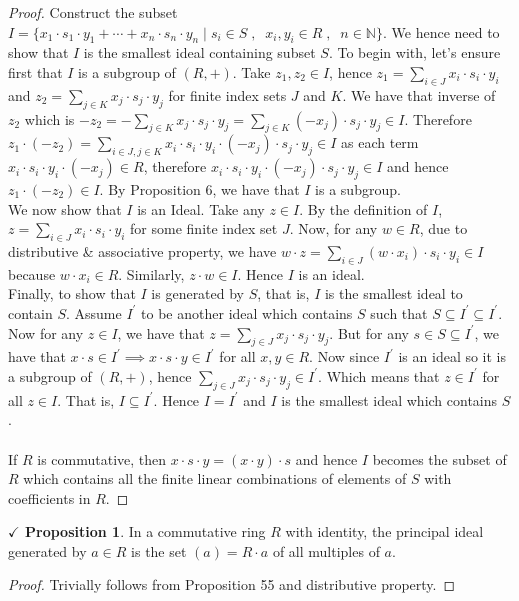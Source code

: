 \documentclass{article}
\theoremstyle{definition}
\theoremstyle{remark}
\theoremstyle{definition}
\theoremstyle{definition}
\newtheorem{proposition}{$\checkmark$ Proposition}
\theoremstyle{definition}
\theoremstyle{proof}
\begin{document}
\begin{proof}
	Construct the subset $ I = \{x_1\cdot s_1\cdot y_1 + \cdots + x_n\cdot s_n\cdot y_n \;\vert\;s_i \in S\;,\;\;x_i,y_i\in R\;,\;\;n\in \mathbb{N}\}$. We hence need to show that $ I $ is the smallest ideal containing subset $ S $. To begin with, let's ensure first that $ I $ is a subgroup of $ (R,+) $. Take $ z_1,z_2 \in I $, hence $ z_1 = \sum_{i\in J}x_i \cdot s_i \cdot y_i $ and $ z_2 = \sum_{j\in K} x_j\cdot s_j \cdot y_j$ for finite index sets $ J $ and $ K $. We have that inverse of $ z_2 $ which is $ -z_2 = - \sum_{j\in K}x_j\cdot s_j\cdot y_j = \sum_{j\in K}(-x_j)\cdot s_j\cdot y_j \in I$. Therefore $ z_1\cdot (-z_2) = \sum_{i\in J,j\in K}x_i\cdot s_i\cdot y_i \cdot (-x_j) \cdot s_j \cdot y_j \in I$ as each term $ x_i\cdot s_i\cdot y_i\cdot (-x_j) \in R $, therefore $ x_i\cdot s_i\cdot y_i \cdot (-x_j) \cdot s_j \cdot y_j \in I $ and hence $ z_1\cdot (-z_2)\in I $. By Proposition 6, we have that $ I $ is a subgroup.\\
	We now show that $ I $ is an Ideal. Take any $ z \in I $. By the definition of $ I $, $ z = \sum_{i\in J} x_i\cdot s_i\cdot y_i $ for some finite index set $ J $. Now, for any $ w\in R $, due to distributive \& associative property, we have $ w\cdot z = \sum_{i\in J}(w\cdot x_i)\cdot s_i\cdot y_i \in I $ because $ w\cdot x_i \in R$. Similarly, $ z\cdot w\in I $. Hence $ I $ is an ideal.\\
	Finally, to show that $ I $ is generated by $ S $, that is, $ I $ is the smallest ideal to contain $ S $. Assume $ I^\prime $ to be another ideal which contains $ S $ such that $ S\subseteq I^\prime \subseteq I^\prime $. Now for any $ z\in I$, we have that $ z = \sum_{j\in J}x_j\cdot s_j\cdot y_j $. But for any $ s\in S \subseteq I^\prime$, we have that $ x\cdot s \in I^\prime \implies x\cdot s\cdot y \in I^\prime $ for all $ x,y\in R $. Now since $ I^\prime $ is an ideal so it is a subgroup of $ (R,+) $, hence $ \sum_{j\in J}x_j\cdot s_j \cdot y_j \in I^\prime$. Which means that $ z\in I^\prime $ for all $ z\in I $. That is, $ I\subseteq I^\prime $. Hence $ I=I^\prime $ and $ I $ is the smallest ideal which contains $ S $.\\\\
	If $ R $ is commutative, then $ x\cdot s\cdot y = (x\cdot y)\cdot s $ and hence $ I $ becomes the subset of $ R $ which contains all the finite linear combinations of elements of $ S $ with coefficients in $ R $.
\end{proof}

\newpage
\begin{proposition}
In a commutative ring $ R $ with identity, the principal ideal generated by $ a\in R $ is the set $ (a) = R\cdot a $ of all multiples of $ a $.
\end{proposition}
\begin{proof}
	Trivially follows from Proposition 55 and distributive property.
\end{proof}
\hrulefill
\end{document}
